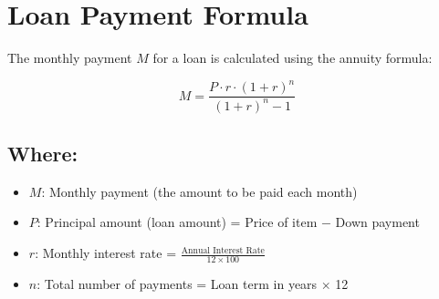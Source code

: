 \documentclass{article}
\begin{document}
\section*{Loan Payment Formula}

The monthly payment \( M \) for a loan is calculated using the annuity formula:

\[
M = \frac{P \cdot r \cdot (1 + r)^n}{(1 + r)^n - 1}
\]

\subsection*{Where:}
\begin{itemize}
  \item \( M \): Monthly payment (the amount to be paid each month)
  \item \( P \): Principal amount (loan amount) = Price of item $-$ Down payment
  \item \( r \): Monthly interest rate = \(\frac{\text{Annual Interest Rate}}{12 \times 100}\)
  \item \( n \): Total number of payments = Loan term in years \( \times \) 12
\end{itemize}
\end{document}
